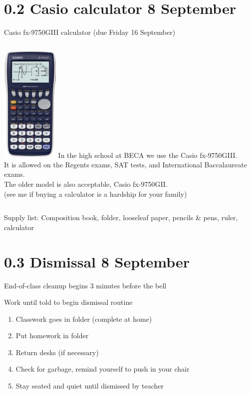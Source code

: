\section{0.2 Casio calculator \hfill 8 September}
\begin{frame}{Casio fx-9750GIII calculator (due Friday 16 September)}
  \begin{columns}
      \includegraphics[width=2.75cm]{../graphics/casio_fx-9750GII.png}
      In the high school at BECA we use the Casio fx-9750GIII.\\[5pt] 
      It is allowed on the Regents exams, SAT tests, and International Baccalaureate exams.\\[5pt]
      The older model is also acceptable, Casio fx-9750\alert{GII}.\\[5pt]
      (see me if buying a calculator is a hardship for your family)
    \end{columns} \vspace{1cm}
  Supply list: Composition book, folder, looseleaf paper, pencils \& pens, ruler, calculator
\end{frame}

\section{0.3 Dismissal \hfill 8 September}
\begin{frame}{End-of-class cleanup begins 3 minutes before the bell}
  \begin{block}{Work until told to begin dismissal routine}
    \begin{enumerate}
      \item Classwork goes in folder (complete at home)
      \item Put homework in folder
      \item Return desks (if necessary)
      \item Check for garbage, remind yourself to push in your chair
      \item Stay seated and quiet until dismissed by teacher
    \end{enumerate}
    \end{block}
  \end{frame}

